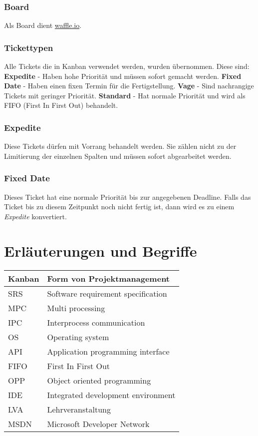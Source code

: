 \documentclass[a4paper]{book}
\begin{document}
\subsubsection{Board}
Als Board dient \href{https://waffle.io/chronos38/libipc-}{waffle.io}.

\subsubsection{Tickettypen}
Alle Tickets die in Kanban verwendet werden, wurden übernommen. Diese sind:\newline
\textbf{Expedite} - Haben hohe Priorität und müssen sofort gemacht werden.\newline
\textbf{Fixed Date} - Haben einen fixen Termin für die Fertigstellung.\newline
\textbf{Vage} - Sind nachrangige Tickets mit geringer Priorität.\newline
\textbf{Standard} - Hat normale Priorität und wird als FIFO (First In First Out) behandelt.

\subsubsection{Expedite}
Diese Tickets dürfen mit Vorrang behandelt werden. Sie zählen nicht zu der Limitierung der einzelnen Spalten und müssen sofort abgearbeitet werden.

\subsubsection{Fixed Date}
Dieses Ticket hat eine normale Priorität bis zur angegebenen Deadline. Falls das Ticket bis zu diesem Zeitpunkt noch nicht fertig ist, dann wird es zu einem \textit{Expedite} konvertiert.

\section{Erläuterungen und Begriffe}
\begin{center}
\begin{longtable}{|p{3cm}|p{8cm}|}
\hline
Kanban & Form von Projektmanagement \\
\hline
SRS & Software requirement specification \\
\hline
MPC & Multi processing \\
\hline
IPC & Interprocess communication \\
\hline
OS & Operating system \\
\hline
API & Application programming interface \\
\hline
FIFO & First In First Out \\
\hline
OPP & Object oriented programming \\
\hline
IDE & Integrated development environment \\
\hline
LVA & Lehrveranstaltung \\
\hline
MSDN & Microsoft Developer Network \\
\hline
\end{longtable}
\end{center}
\end{document}
